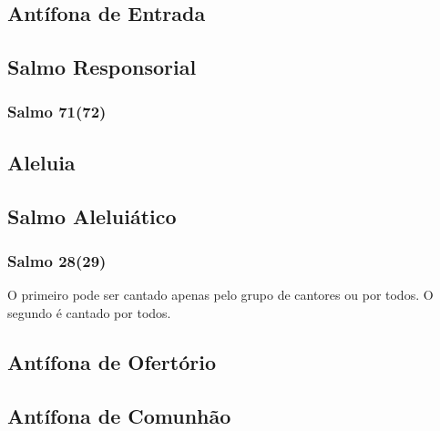 \subsection{Antífona de Entrada}\label{subsection:tempus-nativitatis/in-epiphania-domini/introitus}

\AllowPageFlush

\subsection[Salmo Responsorial]{Salmo Responsorial}\label{subsection:tempus-nativitatis/in-epiphania-domini/psalmus-responsorius}
\subsubsection{Salmo 71(72)}

\subsection{Aleluia}\label{subsection:tempus-nativitatis/in-epiphania-domini/alleluia}

\AllowPageFlush

\subsection[Salmo Aleluiático]{Salmo Aleluiático}\label{subsection:tempus-nativitatis/in-epiphania-domini/psalmus-alleluiaticus}
\subsubsection{Salmo 28(29)}
\begin{rubrica}
  O primeiro {\normalfont\Rbar} pode ser cantado apenas pelo grupo de cantores ou por todos. O segundo {\normalfont\Rbar} é cantado por todos.
\end{rubrica}

\AllowPageFlush

\subsection{Antífona de Ofertório}\label{subsection:tempus-nativitatis/in-epiphania-domini/offertorium}

\AllowPageBreak

\subsection{Antífona de Comunhão}\label{subsection:tempus-nativitatis/in-epiphania-domini/communio}

\AllowPageFlush